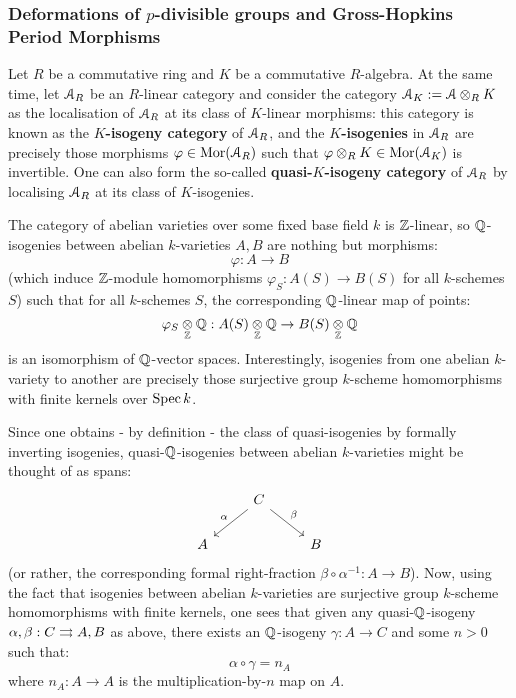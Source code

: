         \subsubsection{Deformations of \texorpdfstring{$p$}{}-divisible groups and Gross-Hopkins Period Morphisms}
            \begin{definition} \label{def: quasi_isogenies}
                Let $R$ be a commutative ring and $K$ be a commutative $R$-algebra. At the same time, let $\mathcal{A}_R$ be an $R$-linear category and consider the category $\calA_K := \calA \tensor_R K$ as the localisation of $\mathcal{A}_R$ at its class of $K$-linear morphisms: this category is known as the \textbf{$K$-isogeny category} of $\mathcal{A}_R$, and the \textbf{$K$-isogenies} in $\mathcal{A}_R$ are precisely those morphisms $\varphi \in \mathrm{Mor}(\mathcal{A}_R)$ such that $\varphi \tensor_R K \in \Mor(\calA_K)$ is invertible. One can also form the so-called \textbf{quasi-$K$-isogeny category} of $\mathcal{A}_R$ by localising $\mathcal{A}_R$ at its class of $K$-isogenies.
            \end{definition}
            \begin{example} \label{example: quasi_isogenies_between_abelian_varieties}
                The category of abelian varieties over some fixed base field $k$ is $\mathbb{Z}$-linear, so $\mathbb{Q}$-isogenies between abelian $k$-varieties $A, B$ are nothing but morphisms:
                    $$\varphi: A \to B$$
                (which induce $\mathbb{Z}$-module homomorphisms $\varphi_S: A(S) \to B(S)$ for all $k$-schemes $S$) such that for all $k$-schemes $S$, the corresponding $\mathbb{Q}$-linear map of points:
                    $$\varphi_S \tensor_{\Z} \Q: A(S) \tensor_{\Z} \Q \to B(S) \tensor_{\Z} \Q$$
                is an isomorphism of $\mathbb{Q}$-vector spaces. Interestingly, isogenies from one abelian $k$-variety to another are precisely those surjective group $k$-scheme homomorphisms with finite kernels over $\operatorname{Spec} k$.
                
                Since one obtains - by definition - the class of quasi-isogenies by formally inverting isogenies, quasi-$\mathbb{Q}$-isogenies between abelian $k$-varieties might be thought of as spans:
                    $$
                        \begin{tikzcd}
                        	& C \\
                        	A && B
                        	\arrow["\alpha"', from=1-2, to=2-1]
                        	\arrow["\beta", from=1-2, to=2-3]
                        \end{tikzcd}
                    $$
                (or rather, the corresponding formal right-fraction $\beta \circ \alpha^{-1}: A \to B$). Now, using the fact that isogenies between abelian $k$-varieties are surjective group $k$-scheme homomorphisms with finite kernels, one sees that given any quasi-$\mathbb{Q}$-isogeny $\alpha, \beta: C \rightrightarrows A, B$ as above, there exists an $\mathbb{Q}$-isogeny $\gamma: A \to C$ and some $n > 0$ such that:
                    $$\alpha \circ \gamma = n_A$$
                where $n_A: A \to A$ is the multiplication-by-$n$ map on $A$. 
            \end{example}
            
